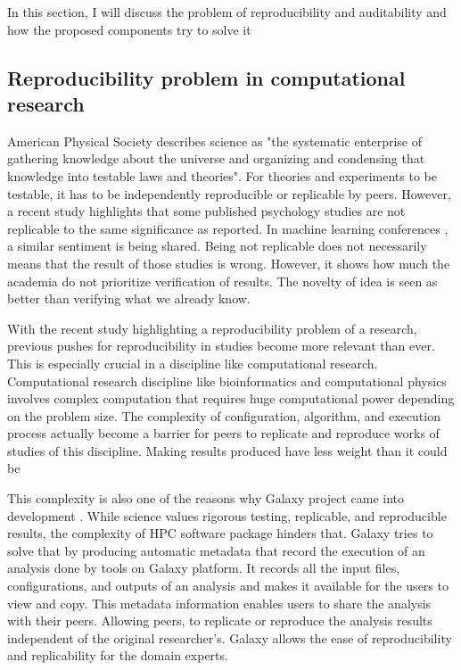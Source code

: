 In this section, I will discuss the problem of reproducibility and auditability and how the proposed components try to solve it

\subsection{Reproducibility problem in computational research}

American Physical Society \citep{APS:aa} describes science as "the systematic enterprise of gathering knowledge about the universe and organizing and condensing that knowledge into testable laws and theories". For theories and experiments to be testable, it has to be independently reproducible or replicable by peers. However, a recent study \citep{open2015estimating} highlights  that some published psychology studies are not replicable to the same significance as reported. In machine learning conferences \citep{drummond2009replicability}, a similar sentiment is being shared. Being not replicable does not necessarily means that the result of those studies is wrong. However, it shows how much the academia do not prioritize verification of results. The novelty of idea is seen as better than verifying what we already know.

With the recent study highlighting a reproducibility problem of a research, previous pushes \citep{donoho2010invitation, sandve2013ten} for reproducibility in studies become more relevant than ever. This is especially crucial in a discipline like computational research. Computational research discipline like bioinformatics and computational physics involves complex computation that requires huge computational power depending on the problem size. The complexity of  configuration, algorithm, and execution process actually become a barrier for peers to replicate and reproduce works of studies of this discipline. Making results produced have less weight than it could be

This complexity is also one of the reasons why Galaxy project came into development \citep{goecks2010galaxy}. While science values rigorous testing, replicable, and reproducible results, the complexity of HPC software package hinders that.  Galaxy tries to solve that by producing automatic metadata that record the execution of an analysis done by tools on Galaxy platform. It records all the input files, configurations, and outputs of an analysis and makes it available for the users to view and copy. This metadata information enables users to share the analysis with their peers. Allowing peers, to replicate or reproduce the analysis results independent of the original researcher's. Galaxy allows the ease of reproducibility and replicability for the domain experts. 



